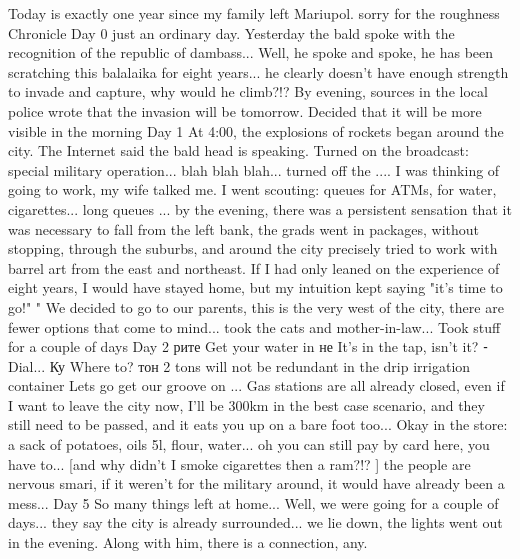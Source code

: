  
 
 
 
 

Today is exactly one year since my family left Mariupol. sorry for the roughness
Chronicle
Day 0
just an ordinary day. Yesterday the bald spoke with the recognition of the republic of dambass... Well, he spoke and spoke, he has been scratching this balalaika for eight years... he clearly doesn't have enough strength to invade and capture, why would he climb?!?
By evening, sources in the local police wrote that the invasion will be tomorrow. Decided that it will be more visible in the morning
Day 1
At 4:00, the explosions of rockets began around the city. The Internet said the bald head is speaking. Turned on the broadcast: special military operation... blah blah blah... turned off the .... I was thinking of going to work, my wife talked me. I went scouting: queues for ATMs, for water, cigarettes... long queues ... by the evening, there was a persistent sensation that it was necessary to fall from the left bank, the grads went in packages, without stopping, through the suburbs, and around the city precisely tried to work with barrel art from the east and northeast. If I had only leaned on the experience of eight years, I would have stayed home, but my intuition kept saying "it's time to go!" "
We decided to go to our parents, this is the very west of the city, there are fewer options that come to mind... took the cats and mother-in-law... Took stuff for a couple of days
Day 2
рите Get your water in
не It's in the tap, isn't it?
⁃ Dial...
Ку Where to?
тон 2 tons will not be redundant in the drip irrigation container
Lets go get our groove on ... Gas stations are all already closed, even if I want to leave the city now, I'll be 300km in the best case scenario, and they still need to be passed, and it eats you up on a bare foot too...
Okay in the store: a sack of potatoes, oils 5l, flour, water... oh you can still pay by card here, you have to... [and why didn't I smoke cigarettes then a ram?!? ] the people are nervous smari, if it weren't for the military around, it would have already been a mess...
Day 5
So many things left at home... Well, we were going for a couple of days... they say the city is already surrounded... we lie down, the lights went out in the evening. Along with him, there is a connection, any.
